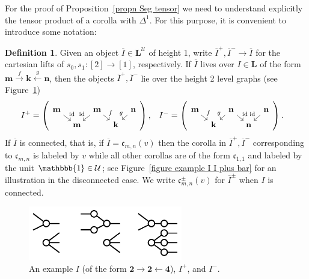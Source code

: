 \documentclass{amsart}
\numberwithin{theorem}{subsection}
\theoremstyle{definition}
\newtheorem{defn}[theorem]{Definition}
\newcommand{\bbone}{\mathbbb{1}}
\newcommand{\xU}{\mathcal{U}}
\newcommand{\olI}{\overline{I}}
\newcommand{\xfc}{\mathfrak{c}}
\newcommand{\id}{\operatorname{id}}
\newcommand{\levelg}{\mathbf{L}}
\newcommand{\levelU}{\levelg^\xU}
\begin{document}
For the proof of Proposition~\ref{propn Seg tensor} we need to understand explicitly the tensor product of a corolla with $\Delta^{1}$. 
For this purpose, it is convenient to introduce some notation:
\begin{defn}\label{def X pm}
	Given an object ${\olI} \in \levelU$ of height 1, write ${\olI}^{+},{\olI}^{-} \to {\olI}$ for the cartesian lifts of $s_{0},s_{1} \colon [2] \to [1]$, respectively.
	If $\olI$ lives over $I \in \levelg$ of the form $\mathbf{m} \overset{f}{\to} \mathbf{k} \overset{g}{\leftarrow} \mathbf{n}$, then the objects ${\olI}^{+},{\olI}^{-}$ lie over the height 2 level graphs (see Figure~\ref{figure I Iplus Iminus})
	\begin{align*}
	I^+ &= \left( \begin{tikzcd}[ampersand replacement=\&, row sep=tiny, column sep=tiny]
\mathbf{m} \arrow[dr, "\id"] \& \& \mathbf{m} \arrow[dl, "\id" swap] \arrow[dr, "f"] \&
\& \mathbf{n} \arrow[dl,"g" swap]
 \\
\& \mathbf{m} \& \& \mathbf{k} 
	\end{tikzcd} \right), & 
I^- &= \left( \begin{tikzcd}[ampersand replacement=\&, row sep=tiny, column sep=tiny]
\mathbf{m} \arrow[dr, "f"] \& \& \mathbf{n} \arrow[dl, "g" swap] \arrow[dr, "\id"] \&
\& \mathbf{n} \arrow[dl,"\id" swap]
 \\
\& \mathbf{k} \& \& \mathbf{n} 
	\end{tikzcd} \right).
	\end{align*}
	If $\olI$ is connected, that is, if $\olI = \xfc_{m,n}(v)$ then the corolla in $\olI^{+},\olI^{-}$ corresponding to $\xfc_{m,n}$ is labeled by $v$ while all other corollas are of the form $\xfc_{1,1}$ and labeled by the unit $\bbone\in \xU$; see Figure~\ref{figure example I I plus bar} for an illustration in the disconnected case. 
	We write $\xfc_{m,n}^{\pm}(v)$ for $\olI^{\pm}$ when $I$ is connected.
\end{defn}

\begin{figure}
\includegraphics[width=0.6\textwidth]{I_Iplus_Iminus.pdf}
\caption{An example $I$ (of the form $\mathbf{2} \to \mathbf{2} \leftarrow \mathbf{4}$), $I^+$, and $I^-$.}
\label{figure I Iplus Iminus}
\end{figure}
\end{document}
